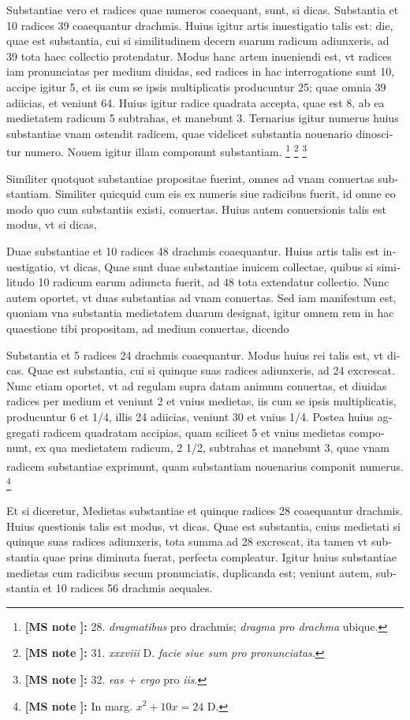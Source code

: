 \documentclass[11pt,a4paper]{book}
\newcounter{critnotectr}
\newcommand{\critnote}[1]{\stepcounter{critnotectr}\textsuperscript{\tiny\textcolor{criticalnote}{\thecritnotectr}}\footnote{\tiny\textcolor{criticalnote}{\textbf{[MS note \thecritnotectr]:} #1}}}
\begin{document}
\textlatin{Substantiae vero et radices quae numeros coaequant, sunt, si dicas. Substantia et 10 radices 39 coaequantur drachmis. Huius igitur artis inuestigatio talis est: die, quae est substantia, cui si similitudinem decern suarum radicum adiunxeris, ad 39 tota haec collectio protendatur. Modus hanc artem inueniendi est, vt radices iam pronunciatas per medium diuidas, sed radices in hac interrogatione sunt 10, accipe igitur 5, et iis cum se ipsis multiplicatis producuntur 25; quae omnia 39 adiicias, et veniunt 64. Huius igitur radice quadrata accepta, quae est 8, ab ea medietatem radicum 5 subtrahas, et manebunt 3. Ternarius igitur numerus huius substantiae vnam ostendit radicem, quae videlicet substantia nouenario dinoscitur numero. Nouem igitur illam componunt substantiam.}
\critnote{28. \textit{dragmatibus} pro drachmis; \textit{dragma pro drachma} ubique.}
\critnote{31. \textit{xxxviii} D. \textit{facie siue sum pro pronunciatas}.}
\critnote{32. \textit{eas + ergo} pro \textit{iis}.}

\textlatin{Similiter quotquot substantiae propositae fuerint, omnes ad vnam conuertas substantiam. Similiter quicquid cum eis ex numeris siue radicibus fuerit, id omne eo modo quo cum substantiis existi, conuertas. Huius autem conuersionis talis est modus, vt si dicas,}

\textlatin{Duae substantiae et 10 radices 48 drachmis coaequantur. Huius artis talis est inuestigatio, vt dicas, Quae sunt duae substantiae inuicem collectae, quibus si similitudo 10 radicum earum adiuncta fuerit, ad 48 tota extendatur collectio. Nunc autem oportet, vt duas substantias ad vnam conuertas. Sed iam manifestum est, quoniam vna substantia medietatem duarum designat, igitur omnem rem in hac quaestione tibi propositam, ad medium conuertas, dicendo}

\textlatin{Substantia et 5 radices 24 drachmis coaequantur. Modus huius rei talis est, vt dicas. Quae est substantia, cui si quinque suas radices adiunxeris, ad 24 excrescat. Nunc etiam oportet, vt ad regulam supra datam animum conuertas, et diuidas radices per medium et veniunt 2 et vnius medietas, iis cum se ipsis multiplicatis, producuntur 6 et 1/4, illis 24 adiicias, veniunt 30 et vnius 1/4. Postea huius aggregati radicem quadratam accipias, quam scilicet 5 et vnius medietas componunt, ex qua medietatem radicum, 2 1/2, subtrahas et manebunt 3, quae vnam radicem substantiae exprimunt, quam substantiam nouenarius componit numerus.}
\critnote{In marg. $x^2 + 10x = 24$ D.}

\textlatin{Et si diceretur, Medietas substantiae et quinque radices 28 coaequantur drachmis. Huius questionis talis est modus, vt dicas. Quae est substantia, cuius medietati si quinque suas radices adiunxeris, tota summa ad 28 excrescat, ita tamen vt substantia quae prius diminuta fuerat, perfecta compleatur. Igitur huius substantiae medietas cum radicibus secum pronunciatis, duplicanda est; veniunt autem, substantia et 10 radices 56 drachmis aequales.}
\end{document}
